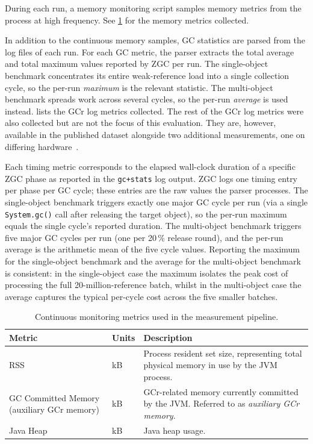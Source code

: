 During each run, a memory monitoring script samples memory metrics from the process at high frequency. See \cref{tab:memory-monitoring-metrics} for the memory metrics collected.

In addition to the continuous memory samples, \ac{GC} statistics are parsed from the log files of each run. For each \ac{GC} metric, the parser extracts the total average and total maximum values reported by \ac{ZGC} per run. The single-object benchmark concentrates its entire weak-reference load into a single collection cycle, so the per-run \emph{maximum} is the relevant statistic. The multi-object benchmark spreads work across several cycles, so the per-run \emph{average} is used instead.  lists the \ac{GCr} log metrics collected. The rest of the \ac{GCr} log metrics were also collected but are not the focus of this evaluation. They are, however, available in the published dataset alongside two additional measurements, one on differing hardware~\cite{hammarberg2026-zenodo}.

Each timing metric corresponds to the elapsed wall-clock duration of a specific \ac{ZGC} phase as reported in the \texttt{gc+stats} log output. \ac{ZGC} logs one timing entry per phase per \ac{GC} cycle; these entries are the raw values the parser processes. The single-object benchmark triggers exactly one major \ac{GC} cycle per run (via a single \texttt{System.gc()} call after releasing the target object), so the per-run maximum equals the single cycle's reported duration. The multi-object benchmark triggers five major \ac{GC} cycles per run (one per 20\,\% release round), and the per-run average is the arithmetic mean of the five cycle values. Reporting the maximum for the single-object benchmark and the average for the multi-object benchmark is consistent: in the single-object case the maximum isolates the peak cost of processing the full 20-million-reference batch, whilst in the multi-object case the average captures the typical per-cycle cost across the five smaller batches.

\begin{table}[t]
\centering
\caption[Continuous monitoring metrics in the measurement pipeline]{Continuous monitoring metrics used in the measurement pipeline.}
\label{tab:memory-monitoring-metrics}
\begin{tabularx}{\textwidth}{@{}XlX@{}}
\toprule
\textbf{Metric} & \textbf{Units} & \textbf{Description} \\
\midrule
\ac{RSS} & kB & Process resident set size, representing total physical memory in use by the \ac{JVM} process. \\
GC Committed Memory (auxiliary \ac{GCr} memory) & kB & \ac{GCr}-related memory currently committed by the \ac{JVM}. Referred to as \emph{auxiliary \ac{GCr} memory}. \\
Java Heap & kB & Java heap usage. \\
\bottomrule
\end{tabularx}
\end{table}

